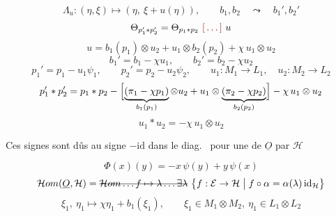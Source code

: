 \documentclass[11pt,a4paper]{article}
\begin{document}

\[
  \Lambda_u : (\eta,\xi) \longmapsto (\eta,\ \xi + u(\eta)),
  \qquad b_1, b_2 \quad\leadsto\quad b_1', b_2'
\]
\[
  \Theta_{p_1' * p_2'} = \Theta_{p_1 * p_2}\ \ill{}\ u
\]
\[
  u = b_1(p_1) \otimes u_2 + u_1 \otimes b_2(p_2) + \chi\, u_1 \otimes u_2
\]
\[
  b_1' = b_1 - \chi u_1, \qquad b_2' = b_2 - \chi u_2
\]
\[
  p_1' = p_1 - u_1\psi_1, \qquad p_2' = p_2 - u_2\psi_2,
  \qquad u_1 : M_1 \to L_1,\quad u_2 : M_2 \to L_2
\]
\[
  p_1' * p_2' = p_1 * p_2 - \Bigl[\underbrace{(\pi_1 - \chi p_1)}_{b_1(p_1)} \otimes u_2
  + u_1 \otimes \underbrace{(\pi_2 - \chi p_2)}_{b_2(p_2)}\Bigr]
  - \chi\, u_1 \otimes u_2
\]
\[
  u_1 * u_2 = -\chi\, u_1 \otimes u_2
\]

Ces signes sont dûs au signe $-\mathrm{id}$ dans le diag.\ \ill{}  \ill{} pour une  \struck{\ill{}} de $\underline{O}$ par $\mathcal{H}$


\[
  \Phi(x)(y) = -x\,\psi(y) + y\,\psi(x)
\]
\[
  \mathcal{H}om(\underline{O}, \mathcal{H})
  = \text{\struck{$\mathcal{H}om \ldots f \mapsto \lambda \ldots \exists \lambda$}}
  \ \bigl\{ f : \mathcal{E} \to \mathcal{H} \bigm| f \circ \alpha = \alpha(\lambda)\,\mathrm{id}_{\mathcal{H}} \bigr\}
\]
\[
  \xi_1,\ \eta_1 \longmapsto \chi\eta_1 + b_1(\xi_1),
  \qquad \xi_1 \in M_1 \otimes M_2,\ \eta_1 \in L_1 \otimes L_2
\]
\end{document}
